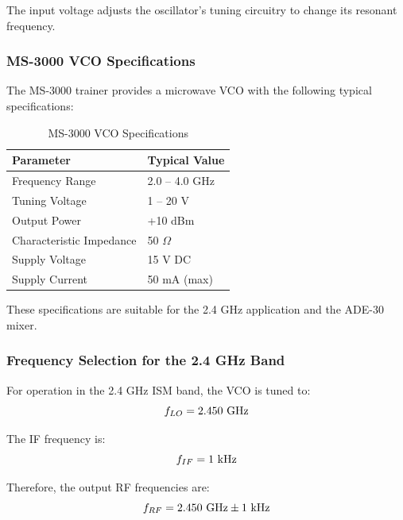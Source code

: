 \documentclass[12pt,a4paper]{report}
\begin{document}
The input voltage adjusts the oscillator's tuning circuitry to change its resonant frequency.

	\subsubsection{MS-3000 VCO Specifications}
		The MS-3000 trainer provides a microwave VCO with the following typical specifications:
	
	\begin{table}[htbp]
		\centering
		\caption{MS-3000 VCO Specifications}
		\label{tab:vco_specs}
		\begin{tabular}{p{5cm} p{5cm}}
			\toprule
			\textbf{Parameter} & \textbf{Typical Value} \\
			\midrule
			Frequency Range & 2.0 -- 4.0 GHz \\
			Tuning Voltage & 1 -- 20 V \\
			Output Power & +10 dBm \\
			Characteristic Impedance & 50 $\Omega$ \\
			Supply Voltage & 15 V DC \\
			Supply Current & 50 mA (max) \\
			\bottomrule
		\end{tabular}
	\end{table}
	
	These specifications are suitable for the 2.4 GHz application and the ADE-30 mixer.
	\subsubsection{Frequency Selection for the 2.4 GHz Band}
	For operation in the 2.4 GHz ISM band, the VCO is tuned to:
	\begingroup
	\setlength{\mathindent}{0pt}
	\begin{equation*}
		\hfill
		f_{LO} = 2.450\ \text{GHz}
		\hfill
	\end{equation*}
	\endgroup
	
	The IF frequency is:
	\begingroup
	\setlength{\mathindent}{0pt}
	\begin{equation*}
		\hfill
		f_{IF} = 1\ \text{kHz}
		\hfill
	\end{equation*}
	\endgroup
	
	Therefore, the output RF frequencies are:
	\begingroup
	\setlength{\mathindent}{0pt}
	\begin{equation*}
		\hfill
		f_{RF} = 2.450\ \text{GHz} \pm 1\ \text{kHz}
		\hfill
	\end{equation*}
	\endgroup
	
\end{document}
